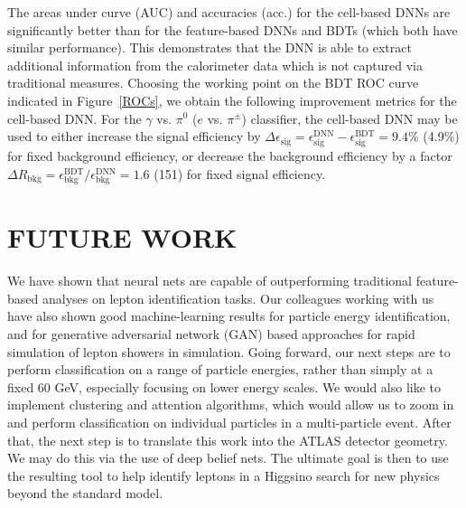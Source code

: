 \documentclass{article}
\begin{document}
The areas under curve (AUC) and accuracies (acc.)
for the cell-based DNNs are significantly better than for the feature-based DNNs and BDTs (which both have similar performance). This demonstrates that the DNN is able to extract additional information from the calorimeter data which is not captured via traditional measures. Choosing the working point on the BDT ROC curve indicated in Figure~\ref{ROCs}, we obtain the following improvement metrics for the cell-based DNN. For the $\gamma$ vs. $\pi^0$ ($e$ vs. $\pi^\pm$) classifier, the cell-based DNN may be used to either increase the signal efficiency by $\Delta \epsilon_{\mathrm{sig}} = \epsilon_{\mathrm{sig}}^{\mathrm{DNN}} - \epsilon_{\mathrm{sig}}^{\mathrm{BDT}}=9.4$\% (4.9\%) for fixed background efficiency, or decrease the background efficiency by a factor $\Delta R_{\mathrm{bkg}} = \epsilon_{\mathrm{bkg}}^{\mathrm{BDT}} / \epsilon_{\mathrm{bkg}}^{\mathrm{DNN}}= 1.6$ (151) for fixed signal efficiency.

\section*{FUTURE WORK}

We have shown that neural nets are capable of outperforming traditional feature-based analyses on lepton identification tasks. Our colleagues working with us have also shown good machine-learning results for particle energy identification, and for generative adversarial network (GAN) based approaches for rapid simulation of lepton showers in simulation. Going forward, our next steps are to perform classification on a range of particle energies, rather than simply at a fixed 60 GeV, especially focusing on lower energy scales. We would also like to implement clustering and attention algorithms, which would allow us to zoom in and perform classification on individual particles in a multi-particle event. After that, the next step is to translate this work into the ATLAS detector geometry. We may do this via the use of deep belief nets. The ultimate goal is then to use the resulting tool to help identify leptons in a Higgsino search for new physics beyond the standard model.
\end{document}
